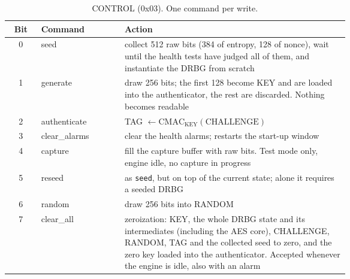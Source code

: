 \begin{table}[htbp]
\centering\small
\caption{CONTROL (0x03). One command per write.}
\label{tab:app_control}
\begin{tabular}{@{}cl>{\raggedright\arraybackslash}p{0.66\linewidth}@{}}
\toprule
Bit & Command & Action \\
\midrule
0 & seed & collect 512 raw bits (384 of entropy, 128 of nonce), wait until
  the health tests have judged all of them, and instantiate the \ac{DRBG}
  from scratch \\
1 & generate & draw 256 bits; the first 128 become KEY and are loaded into
  the authenticator, the rest are discarded. Nothing becomes readable \\
2 & authenticate & TAG $\leftarrow \mathrm{CMAC}_{\text{KEY}}(\text{CHALLENGE})$ \\
3 & clear\_alarms & clear the health alarms; restarts the start-up window \\
4 & capture & fill the capture buffer with raw bits. Test mode only, engine
  idle, no capture in progress \\
5 & reseed & as \texttt{seed}, but on top of the current state; alone it
  requires a seeded \ac{DRBG} \\
6 & random & draw 256 bits into RANDOM \\
7 & clear\_all & zeroization: KEY, the whole \ac{DRBG} state and its
  intermediates (including the \ac{AES} core), CHALLENGE, RANDOM, TAG and
  the collected seed to zero, and the zero key loaded into the
  authenticator. Accepted whenever the engine is idle, also with an
  alarm \\
\bottomrule
\end{tabular}
\end{table}

